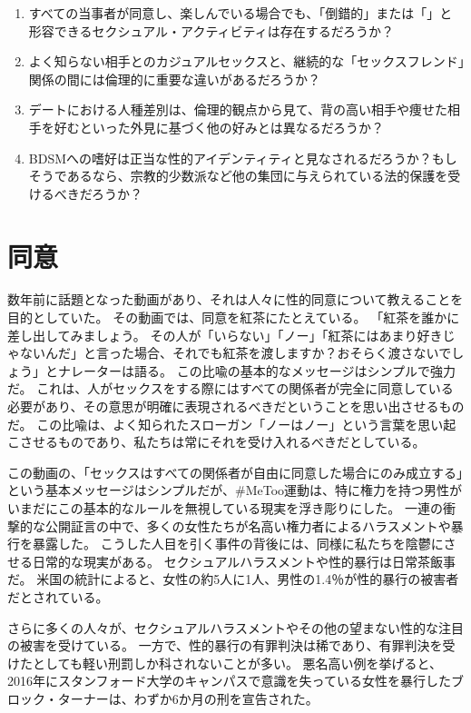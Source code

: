 \documentclass[paper=a4,book,openany]{jlreq} \usepackage{mystyle}
\begin{document}
\begin{enumerate}
    \item すべての当事者が同意し、楽しんでいる場合でも、「倒錯的」または「」と形容できるセクシュアル・アクティビティは存在するだろうか？
    \item よく知らない相手とのカジュアルセックスと、継続的な「セックスフレンド」関係の間には倫理的に重要な違いがあるだろうか？
    \item デートにおける人種差別は、倫理的観点から見て、背の高い相手や痩せた相手を好むといった外見に基づく他の好みとは異なるだろうか？
    \item BDSMへの嗜好は正当な性的アイデンティティと見なされるだろうか？もしそうであるなら、宗教的少数派など他の集団に与えられている法的保護を受けるべきだろうか？
\end{enumerate}

\chapter{同意}

数年前に話題となった動画があり、それは人々に性的同意について教えることを目的としていた。
その動画では、同意を紅茶にたとえている。
「紅茶を誰かに差し出してみましょう。
その人が「いらない」「ノー」「紅茶にはあまり好きじゃないんだ」と言った場合、それでも紅茶を渡しますか？おそらく渡さないでしょう」とナレーターは語る。
この比喩の基本的なメッセージはシンプルで強力だ。
これは、人がセックスをする際にはすべての関係者が完全に同意している必要があり、その意思が明確に表現されるべきだということを思い出させるものだ。
この比喩は、よく知られたスローガン「ノーはノー」という言葉を思い起こさせるものであり、私たちは常にそれを受け入れるべきだとしている\citep{may15:_consen}。

この動画の、「セックスはすべての関係者が自由に同意した場合にのみ成立する」という基本メッセージはシンプルだが、\#MeToo運動は、特に権力を持つ男性がいまだにこの基本的なルールを無視している現実を浮き彫りにした。
一連の衝撃的な公開証言の中で、多くの女性たちが名高い権力者によるハラスメントや暴行を暴露した。
こうした人目を引く事件の背後には、同様に私たちを陰鬱にさせる日常的な現実がある。
セクシュアルハラスメントや性的暴行は日常茶飯事だ。
米国の統計によると、女性の約5人に1人、男性の1.4％が性的暴行の被害者だとされている\citep{black11:_nation_intim_partn_sexual_violen_survey}。

さらに多くの人々が、セクシュアルハラスメントやその他の望まない性的な注目の被害を受けている。
一方で、性的暴行の有罪判決は稀であり、有罪判決を受けたとしても軽い刑罰しか科されないことが多い。
悪名高い例を挙げると、2016年にスタンフォード大学のキャンパスで意識を失っている女性を暴行したブロック・ターナーは、わずか6か月の刑を宣告された\citep{stack16:_light_senten_brock}。
\end{document}

